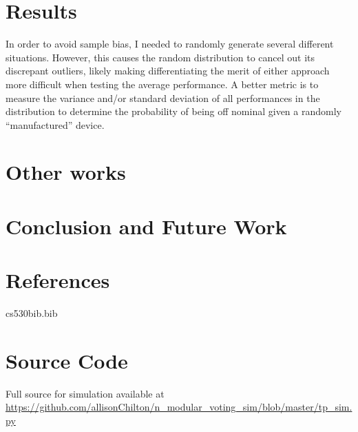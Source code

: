 \documentclass[article]{IEEEtran}
\begin{document}
\section{Results}
In order to avoid sample bias, I needed to randomly generate several different situations. However, this causes the random distribution to cancel out its discrepant outliers, likely making differentiating the merit of either approach more difficult when testing the average performance. A better metric is to measure the variance and/or standard deviation of all performances in the distribution to determine the probability of being off nominal given a randomly “manufactured” device.





\section{Other works}
\section{Conclusion and Future Work}
\section{References}

\begin{filecontents}[overwrite]{cs530bib.bib}


\end{filecontents}

%
\appendix
\section{Source Code}
Full source for simulation available at \url{ https://github.com/allisonChilton/n_modular_voting_sim/blob/master/tp_sim.py}
\end{document}
